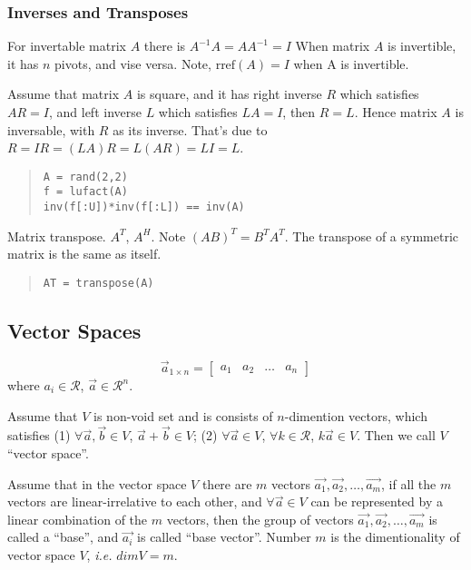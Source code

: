  \subsubsection{Inverses and Transposes}
 For invertable matrix $A$ there is $A^{-1}A = AA^{-1} = I $
 When matrix $A$ is invertible, it has $n$ pivots, and vise versa.
 Note, $\text{rref}(A)=I$ when A is invertible.

 Assume that matrix $A$ is square, and it has right inverse $R$ which
 satisfies $AR=I$, and left inverse $L$ which satisfies $LA=I$, then
 $R=L$. Hence matrix $A$ is inversable, with $R$ as its inverse.
 That's due to $R=IR=(LA)R=L(AR)=LI=L$.

\begin{quote}\begin{lstlisting} 
A = rand(2,2)
f = lufact(A)
inv(f[:U])*inv(f[:L]) == inv(A)
\end{lstlisting}\end{quote}

 Matrix transpose. $A^T$, $A^H$. Note $ (AB)^T = B^T A^T $. 
 The transpose of a symmetric matrix is the same as itself.

\begin{quote}\begin{lstlisting}
AT = transpose(A)
\end{lstlisting}\end{quote}

\subsection{Vector Spaces}

$$ \vec{a}_{1\times n} = \begin{bmatrix} a_1 & a_2 & \ldots & a_n \end{bmatrix} $$
where $a_i \in \mathcal{R}$, $\vec{a} \in \mathcal{R}^n$.

Assume that $V$ is non-void set and is consists of $n$-dimention vectors, which satisfies
(1) $\forall \vec{a},\vec{b} \in V$, $\vec{a}+\vec{b}\in V$;
(2) $\forall \vec{a} \in V$, $\forall k \in \mathcal{R}$, $k\vec{a} \in V$.
Then we call $V$ ``vector space''.

Assume that in the vector space $V$ there are $m$ vectors $\vec{a_1}, \vec{a_2}, \ldots, \vec{a_m}$,
if all the $m$ vectors are linear-irrelative to each other, and $\forall \vec{a} \in V$ can be
represented by a linear combination of the $m$ vectors, then the group of vectors
$\vec{a_1}, \vec{a_2}, \ldots, \vec{a_m}$ is called a ``base'', and $\vec{a_i}$ is called
``base vector''. Number $m$ is the dimentionality of vector space $V$, {\it i.e.} $dimV=m$.

